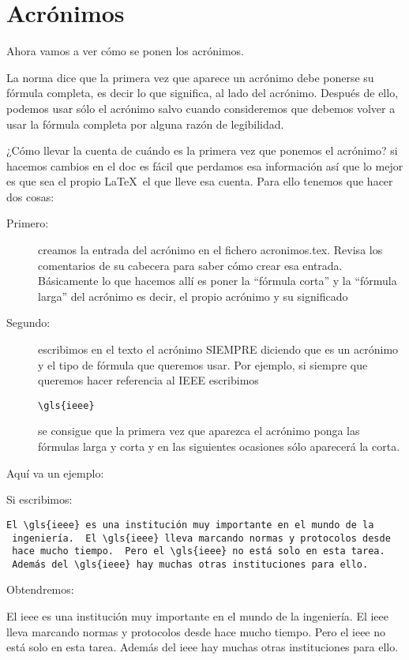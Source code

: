  \section{Acrónimos}
 Ahora vamos a ver cómo se ponen los acrónimos.
 
 La norma dice que la primera vez que aparece un acrónimo debe ponerse su fórmula completa, es decir lo que significa, al lado del acrónimo. Después de ello, podemos usar sólo el acrónimo salvo cuando consideremos que debemos volver a usar la fórmula completa por alguna razón de legibilidad.
 
 ¿Cómo llevar la cuenta de cuándo es la primera vez que ponemos el acrónimo? si hacemos cambios en el doc es fácil que perdamos esa información así que lo mejor es que sea el propio \LaTeX~el que lleve esa cuenta. Para ello tenemos que hacer dos cosas:
 \begin{description}
 \item[Primero:] creamos la entrada del acrónimo en el fichero acronimos.tex. Revisa los comentarios de su cabecera para saber cómo crear esa entrada. Básicamente lo que hacemos allí es poner la ``fórmula corta'' y la ``fórmula larga'' del acrónimo es decir, el propio acrónimo y su significado
 \item[Segundo:] escribimos en el texto el acrónimo SIEMPRE diciendo que es un acrónimo y el tipo de fórmula que queremos usar. Por ejemplo, si siempre que queremos hacer referencia al IEEE escribimos \begin{lstlisting}[style=Latex-color]
 \gls{ieee}
 \end{lstlisting}  se consigue que la primera vez que aparezca el acrónimo ponga las fórmulas larga y corta y en las siguientes ocasiones sólo aparecerá la corta.
 \end{description}
 
 Aquí va un ejemplo:
 
 Si escribimos:
 
\begin{lstlisting}[style=Latex-color]
 El \gls{ieee} es una institución muy importante en el mundo de la
 ingeniería.  El \gls{ieee} lleva marcando normas y protocolos desde
 hace mucho tiempo.  Pero el \gls{ieee} no está solo en esta tarea. 
 Además del \gls{ieee} hay muchas otras instituciones para ello.  \end{lstlisting}
 
 Obtendremos: 
 
El \gls{ieee} es una institución muy importante en el mundo de la
 ingeniería.  El \gls{ieee} lleva marcando normas y protocolos desde
 hace mucho tiempo.  Pero el \gls{ieee} no está solo en esta tarea. 
 Además del \gls{ieee} hay muchas otras instituciones para ello.

